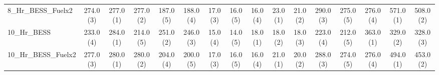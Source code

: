 \begin{tabular}{lccccccccccccccc}
8_Hr_BESS_Fuelx2 & 274.0 (3) & 277.0 (1) & 277.0 (2) & 187.0 (5) & 188.0 (4) & 17.0 (3) & 16.0 (5) & 16.0 (4) & 23.0 (1) & 21.0 (2) & 290.0 (3) & 275.0 (5) & 276.0 (4) & 571.0 (1) & 508.0 (2) \\
10_Hr_BESS & 233.0 (4) & 284.0 (1) & 214.0 (5) & 251.0 (2) & 246.0 (3) & 15.0 (4) & 14.0 (5) & 18.0 (1) & 18.0 (2) & 18.0 (3) & 223.0 (4) & 212.0 (5) & 363.0 (1) & 329.0 (2) & 328.0 (3) \\
10_Hr_BESS_Fuelx2 & 277.0 (3) & 280.0 (1) & 280.0 (2) & 204.0 (4) & 200.0 (5) & 17.0 (3) & 16.0 (5) & 16.0 (4) & 21.0 (1) & 20.0 (2) & 288.0 (3) & 274.0 (5) & 276.0 (4) & 494.0 (1) & 453.0 (2) \\
\bottomrule
\end{tabular}
